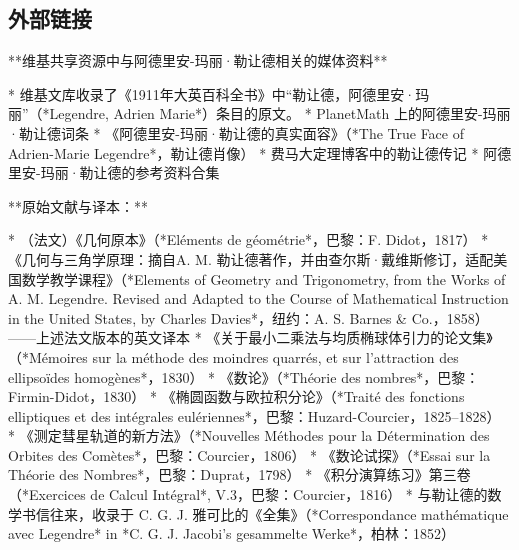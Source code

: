 \subsection{外部链接}
**维基共享资源中与阿德里安-玛丽·勒让德相关的媒体资料**

* 维基文库收录了《1911年大英百科全书》中“勒让德，阿德里安·玛丽”（*Legendre, Adrien Marie*）条目的原文。
* PlanetMath 上的阿德里安-玛丽·勒让德词条
* 《阿德里安-玛丽·勒让德的真实面容》（*The True Face of Adrien-Marie Legendre*，勒让德肖像）
* 费马大定理博客中的勒让德传记
* 阿德里安-玛丽·勒让德的参考资料合集

**原始文献与译本：**

* （法文）《几何原本》（*Eléments de géométrie*，巴黎：F. Didot，1817）
* 《几何与三角学原理：摘自A. M. 勒让德著作，并由查尔斯·戴维斯修订，适配美国数学教学课程》（*Elements of Geometry and Trigonometry, from the Works of A. M. Legendre. Revised and Adapted to the Course of Mathematical Instruction in the United States, by Charles Davies*，纽约：A. S. Barnes & Co.，1858）——上述法文版本的英文译本
* 《关于最小二乘法与均质椭球体引力的论文集》（*Mémoires sur la méthode des moindres quarrés, et sur l'attraction des ellipsoïdes homogènes*，1830）
* 《数论》（*Théorie des nombres*，巴黎：Firmin-Didot，1830）
* 《椭圆函数与欧拉积分论》（*Traité des fonctions elliptiques et des intégrales eulériennes*，巴黎：Huzard-Courcier，1825–1828）
* 《测定彗星轨道的新方法》（*Nouvelles Méthodes pour la Détermination des Orbites des Comètes*，巴黎：Courcier，1806）
* 《数论试探》（*Essai sur la Théorie des Nombres*，巴黎：Duprat，1798）
* 《积分演算练习》第三卷（*Exercices de Calcul Intégral*, V.3，巴黎：Courcier，1816）
* 与勒让德的数学书信往来，收录于 C. G. J. 雅可比的《全集》（*Correspondance mathématique avec Legendre* in *C. G. J. Jacobi’s gesammelte Werke*，柏林：1852）
